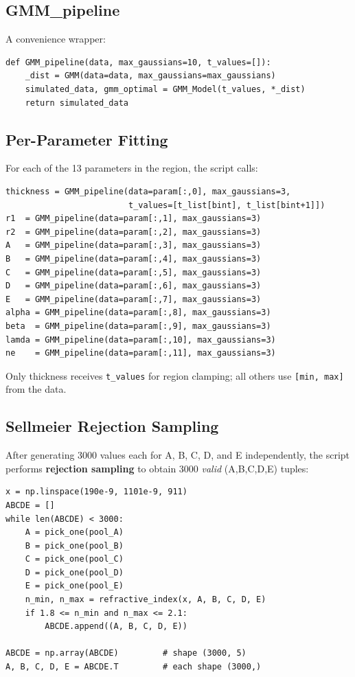 \documentclass[11pt,a4paper]{article}
\begin{document}
\subsection{GMM\_pipeline}

A convenience wrapper:
\begin{lstlisting}
def GMM_pipeline(data, max_gaussians=10, t_values=[]):
    _dist = GMM(data=data, max_gaussians=max_gaussians)
    simulated_data, gmm_optimal = GMM_Model(t_values, *_dist)
    return simulated_data
\end{lstlisting}

\subsection{Per-Parameter Fitting}

For each of the 13 parameters in the region, the script calls:
\begin{lstlisting}
thickness = GMM_pipeline(data=param[:,0], max_gaussians=3,
                         t_values=[t_list[bint], t_list[bint+1]])
r1  = GMM_pipeline(data=param[:,1], max_gaussians=3)
r2  = GMM_pipeline(data=param[:,2], max_gaussians=3)
A   = GMM_pipeline(data=param[:,3], max_gaussians=3)
B   = GMM_pipeline(data=param[:,4], max_gaussians=3)
C   = GMM_pipeline(data=param[:,5], max_gaussians=3)
D   = GMM_pipeline(data=param[:,6], max_gaussians=3)
E   = GMM_pipeline(data=param[:,7], max_gaussians=3)
alpha = GMM_pipeline(data=param[:,8], max_gaussians=3)
beta  = GMM_pipeline(data=param[:,9], max_gaussians=3)
lamda = GMM_pipeline(data=param[:,10], max_gaussians=3)
ne    = GMM_pipeline(data=param[:,11], max_gaussians=3)
\end{lstlisting}
Only thickness receives {\tt t\_values} for region clamping; all others use {\tt [min, max]} from the data.

\subsection{Sellmeier Rejection Sampling}

After generating 3000 values each for A, B, C, D, and E independently, the script performs \textbf{rejection sampling} to obtain 3000 \textit{valid} (A,B,C,D,E) tuples:

\begin{lstlisting}
x = np.linspace(190e-9, 1101e-9, 911)
ABCDE = []
while len(ABCDE) < 3000:
    A = pick_one(pool_A)
    B = pick_one(pool_B)
    C = pick_one(pool_C)
    D = pick_one(pool_D)
    E = pick_one(pool_E)
    n_min, n_max = refractive_index(x, A, B, C, D, E)
    if 1.8 <= n_min and n_max <= 2.1:
        ABCDE.append((A, B, C, D, E))

ABCDE = np.array(ABCDE)         # shape (3000, 5)
A, B, C, D, E = ABCDE.T         # each shape (3000,)
\end{lstlisting}
\end{document}
